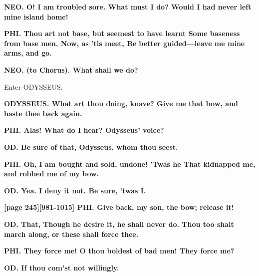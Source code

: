 \documentclass[11pt,letter]{book}
\begin{document}
\par \textbf{NEO. O! I am troubled sore. What must I do? Would I had never left mine island home!}
\par 

\par \textbf{PHI. Thou art not base, but seemest to have learnt Some baseness from base men. Now, as ’tis meet, Be better guided—leave me mine arms, and go.}
\par 

\par \textbf{NEO. (to Chorus). What shall we do?}
\par 

\par  Enter ODYSSEUS.

\par \textbf{ODYSSEUS. What art thou doing, knave? Give me that bow, and haste thee back again.}
\par 

\par \textbf{PHI. Alas! What do I hear? Odysseus’ voice?}
\par 

\par \textbf{OD. Be sure of that, Odysseus, whom thou seest.}
\par 

\par \textbf{PHI. Oh, I am bought and sold, undone! ’Twas he That kidnapped me, and robbed me of my bow.}
\par 

\par \textbf{OD. Yea. I deny it not. Be sure, ’twas I.}
\par 

\par \textbf{[page 245][981-1015] PHI. Give back, my son, the bow; release it!}
\par 

\par \textbf{OD. That, Though he desire it, he shall never do. Thou too shalt march along, or these shall force thee.}
\par 

\par \textbf{PHI. They force me! O thou boldest of bad men! They force me?}
\par 

\par \textbf{OD. If thou com’st not willingly.}
\par 
\end{document}
